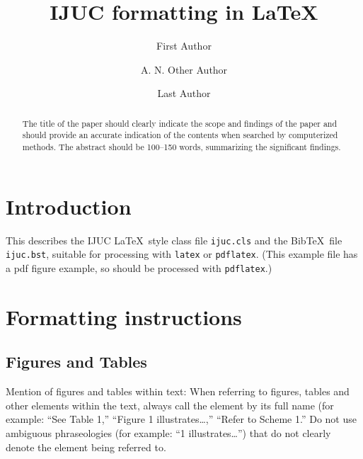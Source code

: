 \documentclass{ijuc}
\begin{document}
\title{IJUC formatting in \LaTeX}

\author{First Author
\and A. N. Other Author 
\and Last Author
}


\def\received{Received 17 December 2004; In final form 1 April 2005}

\maketitle


\begin{abstract}
The title of the paper should clearly indicate the scope and findings
of the paper and should provide an accurate indication of the contents when
searched by computerized methods.
The abstract should be 100--150 words, summarizing the significant findings. 
\end{abstract}




\section{Introduction}

This describes the IJUC \LaTeX\ style
class file {\tt ijuc.cls} and the Bib\TeX\ file {\tt ijuc.bst},
suitable for processing with {\tt latex} or {\tt pdflatex}.
(This example file has a pdf figure example,
so should be processed with {\tt pdflatex}.)

\section{Formatting instructions}

\subsection{Figures and Tables}

Mention of figures and tables within text: When referring to figures, tables
and other elements within the text, always call the element by its full name (for
example: ``See Table 1,'' ``Figure 1 illustrates\ldots,'' ``Refer to Scheme 1.'' Do not
use ambiguous phraseologies (for example: ``1 illustrates\ldots'') that do not clearly
denote the element being referred to.
\end{document}
